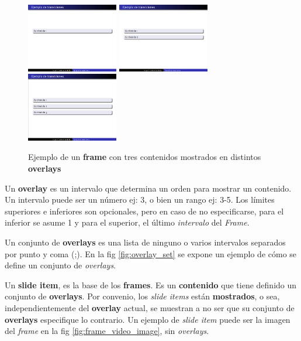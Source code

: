  		\begin{figure}[tb]
 			\centering
 			\includegraphics[width=4cm]{img/content1}
 			\includegraphics[width=4cm]{img/content2}
 			\includegraphics[width=4cm]{img/content3}
 			\caption{Ejemplo de un \textbf{frame} con tres contenidos mostrados en distintos \textbf{overlays}}
 			\label{fig:contents} 
 		\end{figure}		

 		\begin{definition}
 		\label{def:overlay}
 			Un \textbf{overlay} es un intervalo que determina un orden para mostrar un contenido. Un intervalo puede ser un número ej: 3, o bien un rango ej: 3-5. Los límites superiores e inferiores son opcionales, pero en caso de no especificarse, para el inferior se asume 1 y para el superior, el último \textit{intervalo} del \textit{Frame}.
 		\end{definition}

 		\begin{definition}
 		\label{def:ovaerlay_set}
 			Un conjunto de \textbf{overlays} es una lista de ninguno o varios intervalos separados por punto y coma (;). En la fig \ref{fig:overlay_set} se expone un ejemplo de cómo se define un conjunto de \textit{overlays}.
 		\end{definition} 

 		\begin{definition}
 		\label{def:slide_item}
 			Un \textbf{slide item}, es la base de los \textbf{frames}. Es un \textbf{contenido} que tiene definido un conjunto de \textbf{overlays}. Por convenio, los \textit{slide items} están \textbf{mostrados}, o sea, independientemente del \textbf{overlay} actual, se muestran a no ser que su conjunto de \textbf{overlays} especifique lo contrario. Un ejemplo de \textit{slide item} puede ser la imagen del \textit{frame} en la fig \ref{fig:frame_video_image}, sin \textit{overlays}.
 		\end{definition}


